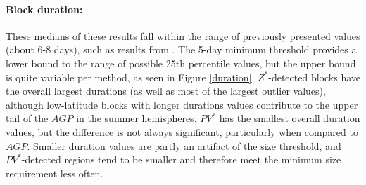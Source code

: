 \documentclass[smallextended]{svjour3}       %
\numberwithin{equation}{section}
\begin{document}
\paragraph{Block duration:} These medians of these results fall within the range of previously presented values (about 6-8 days), such as results from \citealt{wiedenmann_climatology_2002}. The 5-day minimum threshold provides a lower bound to the range of possible 25th percentile values, but the upper bound is quite variable per method, as seen in Figure \ref{duration}. {\color{blue} $Z^*$-detected blocks have the overall largest durations (as well as most of the largest outlier values), although low-latitude blocks with longer durations values contribute to the upper tail of the $AGP$ in the summer hemispheres. $PV^*$ has the smallest overall duration values, but the difference is not always significant, particularly when compared to $AGP$.  Smaller duration values are partly an artifact of the size threshold, and $PV^*$-detected regions tend to be smaller and therefore meet the minimum size requirement less often.  }





\end{document}
